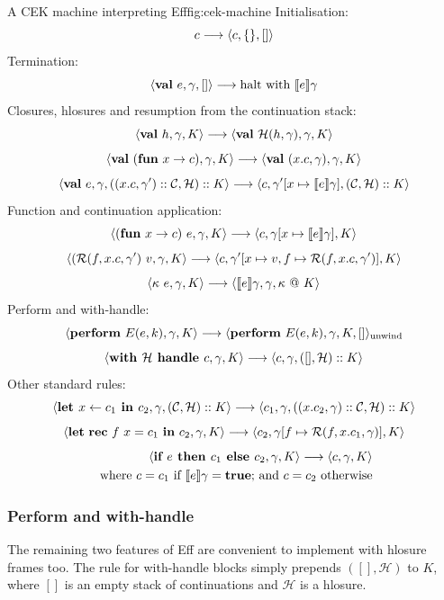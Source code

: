 \documentclass[class=article, crop=false]{standalone}
\begin{document}
\begin{myfigure}[0.9]{A CEK machine interpreting Eff}{fig:cek-machine}
    Initialisation:
    $$ c \longrightarrow \langle c, \{\}, [] \rangle $$
    Termination:
    $$ \langle  \mathbf{val}\  e, \gamma, []  \rangle \longrightarrow \text{halt with } \llbracket e \rrbracket\gamma$$
    Closures, hlosures and resumption from the continuation stack:
    $$ \langle  \mathbf{val}\  h, \gamma, K \rangle \longrightarrow \langle \mathbf{val}\  \mathcal{H}(h, \gamma), \gamma, K \rangle $$
    $$ \langle  \mathbf{val}\  (\mathbf{fun}\  x \to c), \gamma, K \rangle \longrightarrow \langle \mathbf{val}\  (x.c, \gamma), \gamma, K  \rangle $$
    $$ \langle  \mathbf{val}\  e, \gamma, ((x.c, \gamma') :: \mathcal{C}, \mathcal{H}) :: K  \rangle \longrightarrow
        \langle c, \gamma'[x \mapsto \llbracket e \rrbracket\gamma], (\mathcal{C}, \mathcal{H}) :: K \rangle $$
    Function and continuation application:
    $$ \langle  (\mathbf{fun}\  x \to c)\ e, \gamma, K \rangle \longrightarrow \langle c, \gamma[x \mapsto \llbracket e \rrbracket\gamma], K  \rangle $$
    $$ \langle  (\mathcal{R}(f, x.c, \gamma')\ v, \gamma, K \rangle \longrightarrow \langle c, \gamma'[x \mapsto v, f \mapsto \mathcal{R}(f, x.c, \gamma')], K  \rangle $$
    $$ \langle \kappa\ e, \gamma, K  \rangle \longrightarrow \langle  \llbracket e \rrbracket \gamma, \gamma, \kappa\ @\ K  \rangle $$
    Perform and with-handle:
    $$ \langle  \mathbf{perform}\  E(e,k), \gamma, K  \rangle \longrightarrow \langle  \mathbf{perform}\  E(e,k), \gamma, K, []  \rangle_{\text{unwind}} $$
    $$ \langle  \textbf{with } \mathcal{H} \textbf{ handle } c, \gamma, K  \rangle \longrightarrow \langle  c, \gamma, ([], \mathcal{H}) :: K  \rangle $$
    Other standard rules:
    $$ \langle  \textbf{let } x \leftarrow c_1 \textbf{ in } c_2, \gamma, (\mathcal{C}, \mathcal{H}) :: K \rangle \longrightarrow 
    \langle  c_1, \gamma, ((x. c_2, \gamma) :: \mathcal{C}, \mathcal{H}) :: K  \rangle $$
    $$ \langle \mathbf{let}\  \mathbf{rec}\  f\ x = c_1 \ \mathbf{in}\  c_2, \gamma, K \rangle \longrightarrow
    \langle c_2, \gamma[f \mapsto \mathcal{R}(f, x.c_1, \gamma)], K \rangle $$
    \begin{align*}
    \langle  \textbf{if } e \textbf{ then } c_1 \textbf{ else } c_2, \gamma, K  \rangle \longrightarrow \langle  c, \gamma, K  \rangle \\
    \text{ where $c = c_1$ if $\llbracket e \rrbracket \gamma = \textbf{true}$; and $c = c_2$ otherwise}
    \end{align*}
\end{myfigure}

\subsubsection{Perform and with-handle}

The remaining two features of Eff are convenient to implement with hlosure frames too.
The rule for with-handle blocks simply prepends $([], \mathcal{H})$ to $K$, where $[]$ is
an empty stack of continuations and $\mathcal{H}$ is a hlosure.
\end{document}
